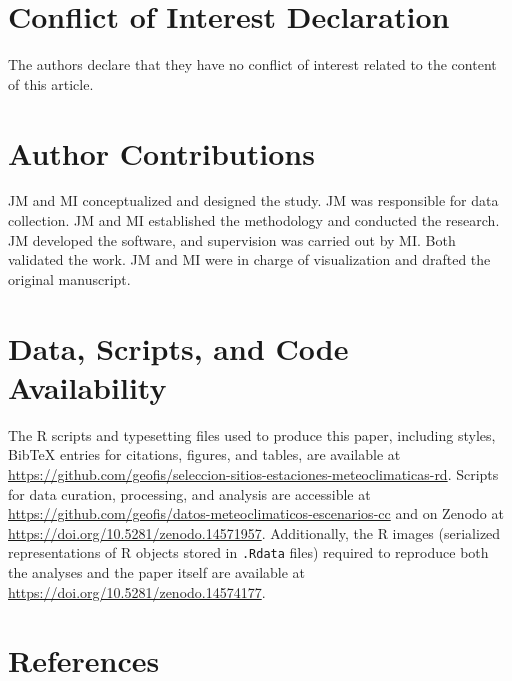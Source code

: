 \documentclass[spanish]{article}
\begin{document}
\hypertarget{conflict-of-interest-declaration}{%
\section*{Conflict of Interest
Declaration}\label{conflict-of-interest-declaration}}

The authors declare that they have no conflict of interest related to
the content of this article.

\hypertarget{author-contributions}{%
\section{Author Contributions}\label{author-contributions}}

JM and MI conceptualized and designed the study. JM was responsible for
data collection. JM and MI established the methodology and conducted the
research. JM developed the software, and supervision was carried out by
MI. Both validated the work. JM and MI were in charge of visualization
and drafted the original manuscript.

\hypertarget{data-scripts-and-code-availability}{%
\section*{Data, Scripts, and Code
Availability}\label{data-scripts-and-code-availability}}

The R scripts and typesetting files used to produce this paper,
including styles, BibTeX entries for citations, figures, and tables, are
available at
\url{https://github.com/geofis/seleccion-sitios-estaciones-meteoclimaticas-rd}.
Scripts for data curation, processing, and analysis are accessible at
\url{https://github.com/geofis/datos-meteoclimaticos-escenarios-cc} and
on Zenodo at \url{https://doi.org/10.5281/zenodo.14571957}.
Additionally, the R images (serialized representations of R objects
stored in \texttt{.Rdata} files) required to reproduce both the analyses
and the paper itself are available at
\url{https://doi.org/10.5281/zenodo.14574177}.

\newpage

\hypertarget{references}{%
\section*{References}\label{references}}
\end{document}
